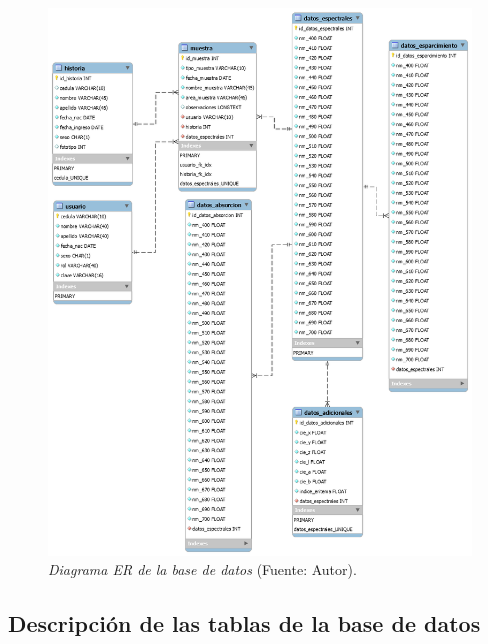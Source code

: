	\begin{figure}[H]
		\centering
		\includegraphics[scale=0.4]{img/diagramaER.png}
			\caption[Diagrama ER de la base de datos]{\textit{Diagrama ER de la base de datos} (Fuente: Autor).}
	\end{figure}
	
	\subsection{Descripci\'{o}n de las tablas de la base de datos}
	
